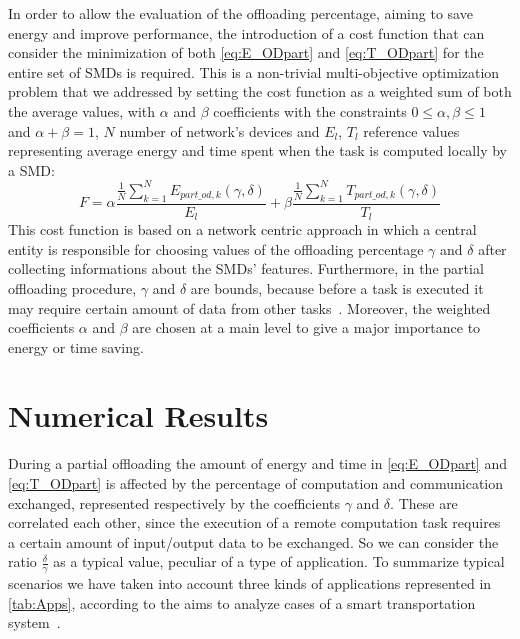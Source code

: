 \documentclass[twoside,openright]{report}
\begin{document}
In order to allow the evaluation of the offloading percentage, aiming to save energy and improve performance, the introduction of a cost function that can consider the minimization of both \autoref{eq:E_ODpart} and \autoref{eq:T_ODpart} for the entire set of \glspl{SMD} is required. 
This is a non-trivial multi-objective optimization problem that we addressed by setting the cost function as a weighted sum of both the average values, with $\alpha$ and $\beta$ coefficients with the constraints $0\le\alpha,\beta\le1$ and $\alpha+\beta=1$, $N$ number of network's devices and ${E_l}$, ${T_l}$ reference values representing average energy and time spent when the task is computed locally by a \gls{SMD}: 
 \begin{equation}
	\label{eq:FCost}
	F = \alpha \frac{\frac{1}{N}\sum_{k=1}^N E_{\textit{part}\_\textit{od},k}(\gamma,\delta)}{E_l} + \beta \frac{\frac{1}{N}\sum_{k=1}^N T_{\textit{part}\_\textit{od},k}(\gamma,\delta)}{T_l}
	\end{equation}            
This cost function is based on a network centric approach in which a central entity is responsible for choosing values of the offloading percentage $\gamma$ and $\delta$ after collecting informations about the \glspl{SMD}' features. 
Furthermore, in the partial offloading procedure, $\gamma$ and $\delta$ are bounds, because before a task is executed it may require certain amount of data from other tasks~\cite{Challenges}. 
Moreover, the weighted coefficients $\alpha$ and $\beta$ are chosen at a main level to give a major importance to energy or time saving.   

\section{Numerical Results}
During a partial offloading the amount of energy and time in \autoref{eq:E_ODpart} and \autoref{eq:T_ODpart} is affected by the percentage of computation and communication exchanged, represented respectively by the coefficients $\gamma$ and $\delta$. 
These are correlated each other, since the execution of a remote computation task requires a certain amount of input/output data to be exchanged. 
So we can consider the ratio $\frac{\delta}{\gamma}$ as a typical value, peculiar of a type of application. To summarize typical scenarios we have taken into account three kinds of applications represented in \autoref{tab:Apps}, according to the aims to analyze cases of a smart transportation system~\cite{TowardCloudBased}.
 
\end{document}
